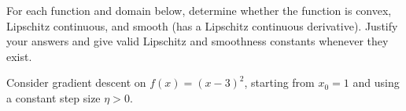 \documentclass[11  pt]{exam}
\begin{document}
\begin{questions}
\begin{parts}
		\end{parts}


		\question For each function and domain below, determine whether the function is convex, Lipschitz continuous, and smooth (has a Lipschitz continuous derivative). Justify your answers and give valid Lipschitz and smoothness constants whenever they exist.




		\question Consider gradient descent on $f(x)=(x-3)^2$, starting from $x_0=1$ and using a constant step size $\eta>0$.





\end{questions}
\end{document}
